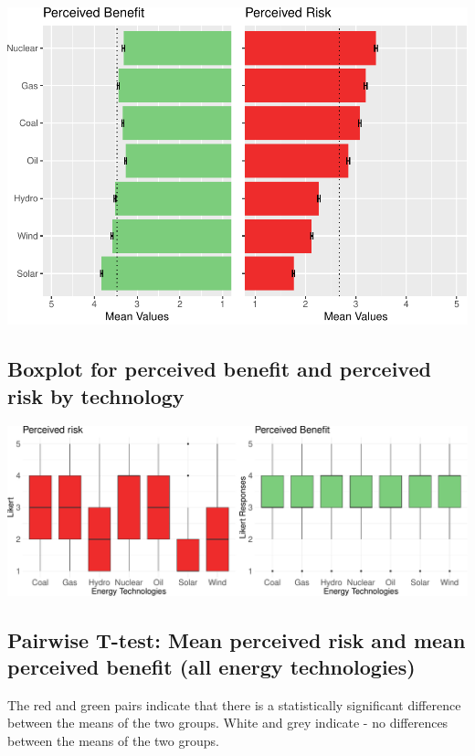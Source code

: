 \documentclass[
]{article}
\begin{document}
\includegraphics{nuclear-in-comparison_files/figure-latex/unnamed-chunk-7-1.pdf}

\hypertarget{boxplot-for-perceived-benefit-and-perceived-risk-by-technology}{%
\subsection{Boxplot for perceived benefit and perceived risk by
technology}\label{boxplot-for-perceived-benefit-and-perceived-risk-by-technology}}

\includegraphics{nuclear-in-comparison_files/figure-latex/unnamed-chunk-8-1.pdf}

\newpage

\hypertarget{pairwise-t-test-mean-perceived-risk-and-mean-perceived-benefit-all-energy-technologies}{%
\subsection{Pairwise T-test: Mean perceived risk and mean perceived
benefit (all energy
technologies)}\label{pairwise-t-test-mean-perceived-risk-and-mean-perceived-benefit-all-energy-technologies}}

The red and green pairs indicate that there is a statistically
significant difference between the means of the two groups. White and
grey indicate - no differences between the means of the two groups.
\end{document}
